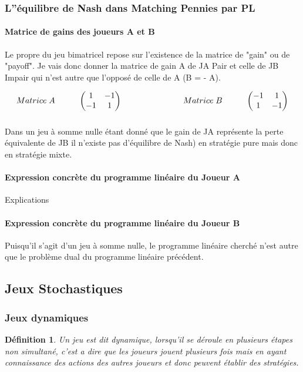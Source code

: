 \documentclass[a4paper, 12pt, twoside]{article}
\newtheorem{definition}{Définition}
\begin{document}
{{{\subsubsection{L''équilibre de Nash dans Matching Pennies par PL}
\paragraph{Matrice de gains des joueurs A et B}{Le propre  du jeu bimatricel repose sur l'existence de la matrice de "gain" ou de "payoff".  Je vais donc donner la matrice de gain A de \textsf{JA} \textsf{Pair} et celle de \textsf{JB} \textsf{Impair} qui n'est autre que l'opposé de celle de  A (B = - A).}

\[
Matrice\hspace{0,1cm} A\hspace{1cm}
\begin{pmatrix}1&-1\\
-1&1\\
\end{pmatrix}\                      \hspace{2,5cm}  
Matrice\hspace{0,1cm} B \hspace{1cm}  
\begin{pmatrix}-1&1\\
1&-1\\
\end{pmatrix} 
\]

\subparagraph*{}{Dans un jeu à \textsf{somme nulle} étant donné que le gain de JA représente la perte équivalente de JB il n'existe pas d'\textsf{équilibre de Nash) en stratégie pure mais donc en stratégie mixte.}

\paragraph{Expression concrète du programme linéaire du Joueur A}{Explications}

\paragraph{Expression concrète du programme linéaire du Joueur B}{Puisqu'il s'agit d'un jeu à somme nulle, le programme linéaire cherché n'est autre que le problème dual du programme linéaire précédent.}
\subsection{Jeux Stochastiques}
\subsubsection{Jeux dynamiques}
\begin{definition}
Un jeu est dit dynamique, lorsqu'il se déroule en plusieurs étapes non simultané, c'est a dire que les joueurs jouent plusieurs fois mais en ayant connaissance des actions des autres joueurs et donc peuvent établir des stratégies.
\end{definition}

}}}}
\end{document}

